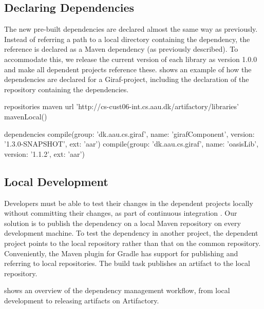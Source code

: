 \subsection{Declaring Dependencies}
The new pre-built dependencies are declared almost the same way as previously. Instead of referring a path to a local directory containing the dependency, the reference is declared as a Maven dependency (as previously described). To accommodate this, we release the current version of each library as version 1.0.0 and make all dependent projects reference these.  shows an example of how the dependencies are declared for a Giraf-project, including the declaration of the repository containing the dependencies.

\begin{gradlecode}[caption={Dependency declaration for a Giraf project},label={lst:dependency_declaration_giraf}]
repositories {
    maven {
        url 'http://cs-cust06-int.cs.aau.dk/artifactory/libraries'
    }
    mavenLocal()
}

dependencies {
    compile(group: 'dk.aau.cs.giraf', name: 'girafComponent', version: '1.3.0-SNAPSHOT', ext: 'aar')
    compile(group: 'dk.aau.cs.giraf', name: 'oasisLib', version: '1.1.2', ext: 'aar')
}
\end{gradlecode}

\subsection{Local Development}
Developers must be able to test their changes in the dependent projects locally without committing their changes, as part of continuous integration \parencite{fowlerCI}. Our solution is to publish the dependency on a local Maven repository on every development machine. To test the dependency in another project, the dependent project points to the local repository rather than that on the common repository. Conveniently, the Maven plugin for Gradle has support for publishing and referring to local repositories. The build task  publishes an artifact to the local repository.

 shows an overview of the dependency management workflow, from local development to releasing artifacts on Artifactory.

